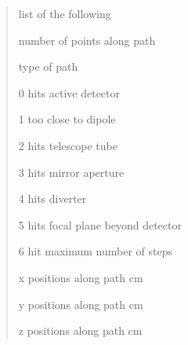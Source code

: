 \documentclass[letterpaper,10pt,english]{sphinxmanual}
\begin{document}
\begin{fulllineitems}
\begin{quote}
\begin{description}
\begin{DUlineblock}{0em}
\item[] list of the following
\item[]
\begin{DUlineblock}{\DUlineblockindent}
\item[]   number of points along path
\item[]   type of path
\item[]
\begin{DUlineblock}{\DUlineblockindent}
\item[] 0 hits active detector
\item[] 1 too close to dipole
\item[] 2 hits telescope tube
\item[] 3 hits mirror aperture
\item[] 4 hits diverter
\item[] 5 hits focal plane beyond detector
\item[] 6 hit maximum number of steps
\end{DUlineblock}
\item[]      x positions along path cm
\item[]      y positions along path cm
\item[]      z positions along path cm
\end{DUlineblock}
\end{DUlineblock}


\end{description}\end{quote}

\end{fulllineitems}

\end{document}
